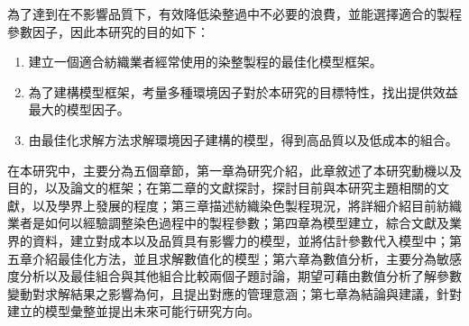 為了達到在不影響品質下，有效降低染整過中不必要的浪費，並能選擇適合的製程參數因子，因此本研究的目的如下：
\begin{enumerate}[(1)]
	\item 建立一個適合紡織業者經常使用的染整製程的最佳化模型框架。
	\item 為了建構模型框架，考量多種環境因子對於本研究的目標特性，找出提供效益最大的模型因子。
	\item 由最佳化求解方法求解環境因子建構的模型，得到高品質以及低成本的組合。
\end{enumerate}
在本研究中，主要分為五個章節，第一章為研究介紹，此章敘述了本研究動機以及目的，以及論文的框架；在第二章的文獻探討，探討目前與本研究主題相關的文獻，以及學界上發展的程度；第三章描述紡織染色製程現況，將詳細介紹目前紡織業者是如何以經驗調整染色過程中的製程參數；第四章為模型建立，綜合文獻及業界的資料，建立對成本以及品質具有影響力的模型，並將估計參數代入模型中；第五章介紹最佳化方法，並且求解數值化的模型；第六章為數值分析，主要分為敏感度分析以及最佳組合與其他組合比較兩個子題討論，期望可藉由數值分析了解參數變動對求解結果之影響為何，且提出對應的管理意涵；第七章為結論與建議，針對建立的模型彙整並提出未來可能行研究方向。

